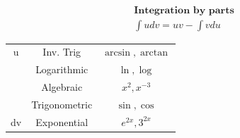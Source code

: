               \textbf{\\}
              \begin{table}[h]
                \begin{align*}
                  \textbf{Integration by parts}\\
                  \int udv = uv- \int vdu
                \end{align*}

                \begin{tabular}{c|c|c}
                  u& Inv. Trig&$\arcsin,\arctan$\\
                  &  Logarithmic & $\ln,\log$\\
                  &  Algebraic & $x^2,x^{-3}$\\
                  &  Trigonometric& $\sin,\cos$ \\
                  dv& Exponential& $e^{2x},3^{2x}$\\
                \end{tabular}
              \end{table}

              \newpage
